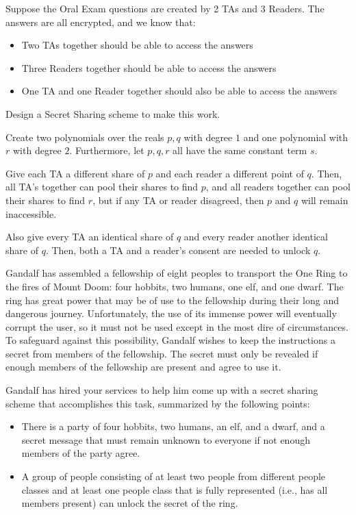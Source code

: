 \documentclass[11pt]{article}
\begin{document}
\newpage
{}

Suppose the Oral Exam questions are created by 2 TAs and 3 Readers. The answers are all encrypted, and we know that:

\begin{itemize}
\item Two TAs together should be able to access the answers
\item Three Readers together should be able to access the answers
\item One TA and one Reader together should also be able to access the answers
\end{itemize}

Design a Secret Sharing scheme to make this work.

\begin{solution}
    Create two polynomials over the reals $p,q$ with degree $1$ and one polynomial with $r$ with degree $2$. Furthermore, let $p, q, r$ all have the same constant term $s$.
    
    Give each TA a different share of $p$ and each reader a different point of $q$. Then, all TA's together can pool their shares to find $p$, and all readers together can pool their shares to find $r$, but if any TA or reader disagreed, then $p$ and $q$ will remain inaccessible.
    
    Also give every TA an identical share of $q$ and every reader another identical share of $q$. Then, both a TA and a reader's consent are needed to unlock $q$. 
\end{solution}

\newpage
{}

Gandalf has assembled a fellowship of eight peoples to transport the One Ring to the fires of Mount Doom: four hobbits, two humans, one elf, and one dwarf. The ring has great power that may be of use to the fellowship during their long and dangerous journey. Unfortunately, the use of its immense power will eventually corrupt the user, so it must not be used except in the most dire of circumstances. To safeguard against this possibility, Gandalf wishes to keep the instructions a secret from members of the fellowship. The secret must only be revealed if enough members of the fellowship are present and agree to use it.

Gandalf has hired your services to help him come up with a secret sharing scheme that accomplishes this task, summarized by the following points:
\begin{itemize}

\item There is a party of four hobbits, two humans, an elf, and a dwarf, and a secret message that must remain unknown to everyone if not enough members of the party agree.
\item A group of people consisting of at least two people from different people classes and at least one people class that is fully represented (i.e., has all members present) can unlock the secret of the ring.

\end{itemize}
\end{document}
